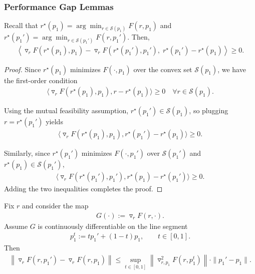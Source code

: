 \subsubsection{Performance Gap Lemmas}


\begin{lemma}\label{lem:mutual_feas_foc}
Recall that $r^\star(p_1)= \arg\min_{r \in\mathcal S(p_1)} F(r, p_1)$ and $r^\star(p_1')= \arg\min_{r \in\mathcal S(p_1')} F(r, p_1')$. 
Then,
\begin{align*}
\left\langle \triangledown_r F(r^\star(p_1),p_1)-\triangledown_r F(r^\star(p_1'),p_1'),\; r^\star(p_1')-r^\star(p_1)\right\rangle \ge 0.
\end{align*}
\end{lemma}

\begin{proof}
Since $r^\star(p_1)$ minimizes $F(\cdot,p_1)$ over the convex set $\mathcal S(p_1)$, we have the first-order condition
\begin{align*}
\langle \triangledown_r F(r^\star(p_1),p_1), r-r^\star(p_1)\rangle \ge 0 \quad \forall r\in\mathcal S(p_1).
\end{align*}

Using the mutual feasibility assumption, $r^\star(p_1')\in\mathcal S(p_1)$, so plugging $r=r^\star(p_1')$ yields
\begin{align*}
\langle \triangledown_r F(r^\star(p_1),p_1), r^\star(p_1')-r^\star(p_1)\rangle \ge 0.
\end{align*}

Similarly, since $r^\star(p_1')$ minimizes $F(\cdot,p_1')$ over $\mathcal S(p_1')$ and $r^\star(p_1)\in\mathcal S(p_1')$,
\begin{align*}
\langle \triangledown_r F(r^\star(p_1'),p_1'), r^\star(p_1)-r^\star(p_1')\rangle \ge 0.
\end{align*}
Adding the two inequalities completes the proof.
\end{proof}


\begin{lemma}\label{lem:mvt_grad_r}
Fix $r$ and consider the map
\begin{align*}
G(\cdot) := \triangledown_r F(r,\cdot).
\end{align*}
Assume $G$ is continuously differentiable on the line segment
\begin{align*}
p_1^t := t p_1' + (1-t)p_1,\qquad t\in[0,1].
\end{align*}
Then
\begin{align*}
\left\|\triangledown_r F(r,p_1')-\triangledown_r F(r,p_1)\right\|
\le
\sup_{t\in[0,1]}\left\|\triangledown^2_{r,p_1}F(r,p_1^t)\right\|\cdot \|p_1'-p_1\|.
\end{align*}
\end{lemma}

